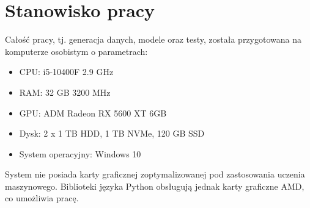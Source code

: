 \section{Stanowisko pracy}
Całość pracy, tj. generacja danych, modele oraz testy, została przygotowana na komputerze osobistym o parametrach:

\begin{itemize}[label=-,labelsep=0.4cm,leftmargin=0.6cm]
\item CPU: i5-10400F 2.9 GHz
\item RAM: 32 GB 3200 MHz
\item GPU: ADM Radeon RX 5600 XT 6GB
\item Dysk: 2 x 1 TB HDD, 1 TB NVMe, 120 GB SSD
\item System operacyjny: Windows 10
\end{itemize}
System nie posiada karty graficznej zoptymalizowanej pod zastosowania uczenia maszynowego.
Biblioteki języka Python obsługują jednak karty graficzne AMD, co umożliwia pracę.